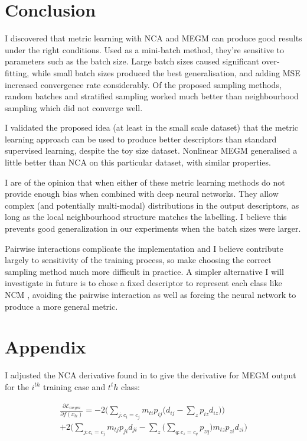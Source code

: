 \section {Conclusion}

I discovered that metric learning with \gls{NCA} and \gls{MEGM} can produce good results under the right conditions. Used as a mini-batch method, they're sensitive to parameters such as the batch size. Large batch sizes caused significant over-fitting,
while small batch sizes produced the best generalisation, and adding \gls{MSE} increased convergence rate considerably. Of the proposed sampling methods, random batches and stratified sampling worked much better than neighbourhood sampling which did not converge well.


I validated the proposed idea (at least in the small scale dataset) that the metric learning approach can be used to produce better descriptors than
standard supervised learning, despite the toy size dataset. Nonlinear \gls{MEGM} generalised a little better than NCA on this particular dataset, with similar
properties.

I are of the opinion that when either of these metric learning methods do not provide enough bias when combined with deep neural networks. They allow
complex (and potentially multi-modal) distributions in the output descriptors, as long as the local neighbourhood structure matches the labelling. I believe
this prevents good generalization in our experiments when the batch sizes were larger.

Pairwise interactions complicate the implementation and I believe contribute largely to sensitivity of the training process, so make choosing the correct sampling method much more difficult in practice. A simpler alternative I will investigate in future is to chose a fixed descriptor to represent each class like \gls{NCM} \cite {Mensink2012}, avoiding the pairwise interaction as well as forcing the neural network to produce a more general metric.



\section{Appendix}
\label{sec:appendix}

 I adjusted the \gls{NCA} derivative found in \cite {Salakhutdinov2007a} to give the derivative for \gls{MEGM} output for the $ i^{th} $ training case and $ t^th $ class:


\begin{multline}
\label{eq:megm_grad}
\frac{\partial \mathcal{E}_{megm}}{\partial f(x_{ti})} = 
  -2 \bigg( \sum_{j:c_i = c_j}  m_{ti} {p_{ij} \Big( d_{ij} - \sum_z{p_{iz}d_{iz}} \Big) } \bigg)\\
  +2 \bigg( \sum_{j:c_i = c_j} m_{tj}{p_{ji}d_{ji} - \sum_z{\Big( \sum_{q:c_z = c_q}{p_{zq}} \Big) m_{tz}p_{zi}d_{zi}   }} \bigg)
\end{multline}

